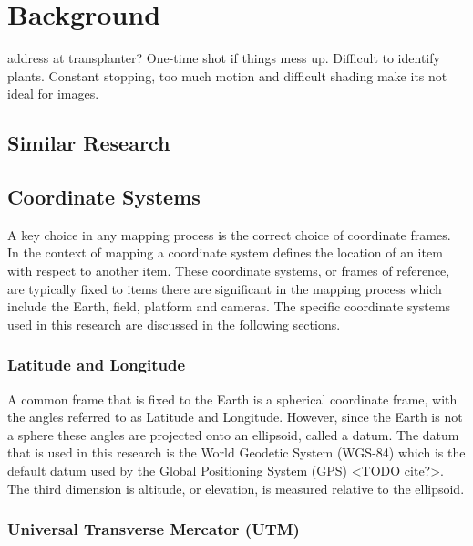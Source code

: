 
\cleardoublepage

\chapter{Background}
\label{background}

address at transplanter?  One-time shot if things mess up.  Difficult to identify plants.  Constant stopping, too much motion and difficult shading make its not ideal for images. 

\section{Similar Research}


\section{Coordinate Systems}

A key choice in any mapping process is the correct choice of coordinate frames.  In the context of mapping a coordinate system defines the location of an item with respect to another item.  These coordinate systems, or frames of reference, are typically fixed to items there are significant in the mapping process which include the Earth, field, platform and cameras.  The specific coordinate systems used in this research are discussed in the following sections.

\subsection{Latitude and Longitude}

A common frame that is fixed to the Earth is a spherical coordinate frame, with the angles referred to as Latitude and Longitude. However, since the Earth is not a sphere these angles are projected onto an ellipsoid, called a datum.  The datum that is used in this research is the World Geodetic System (WGS-84) which is the default datum used by the Global Positioning System (GPS) <TODO cite?>.  The third dimension is altitude, or elevation, is measured relative to the ellipsoid. 

\subsection{Universal Transverse Mercator (UTM)}

